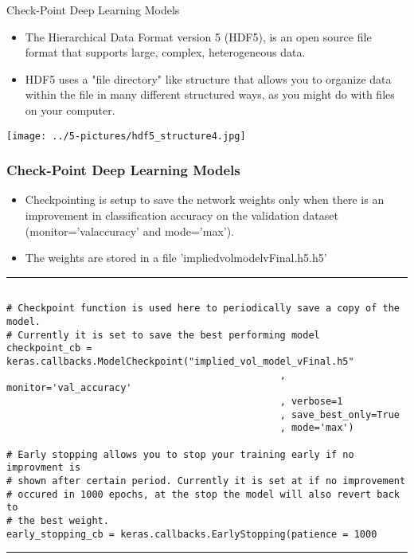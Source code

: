 \documentclass[11pt]{beamer}
\begin{document}
\begin{frame}{Check-Point Deep Learning Models}
\begin{itemize}
\footnotesize
\item The Hierarchical Data Format version 5 (HDF5), is an open source file format that supports large, complex, heterogeneous data. 
\item HDF5 uses a "file directory" like structure that allows you to organize data within the file in many different structured ways, as you might do with files on your computer. 
\end{itemize}
\begin{center}
\texttt{[image: ../5-pictures/hdf5\_structure4.jpg]} 
\end{center}
\end{frame}
\begin{frame}[fragile]
\frametitle{Check-Point Deep Learning Models}
\scriptsize
\begin{itemize}
\item Checkpointing is setup to save the network weights only when there is an improvement in classification accuracy on the validation dataset (monitor=’val\textunderscore accuracy’ and mode=’max’).
\item The weights are stored in a file 'implied\textunderscore vol\textunderscore model\textunderscore vFinal.h5.h5'
\end{itemize}
\rule{\textwidth}{1pt}
\begin{verbatim}

# Checkpoint function is used here to periodically save a copy of the model. 
# Currently it is set to save the best performing model
checkpoint_cb = keras.callbacks.ModelCheckpoint("implied_vol_model_vFinal.h5"
                                                , monitor='val_accuracy'
                                                , verbose=1
                                                , save_best_only=True
                                                , mode='max')

# Early stopping allows you to stop your training early if no improvment is 
# shown after certain period. Currently it is set at if no improvement 
# occured in 1000 epochs, at the stop the model will also revert back to 
# the best weight.
early_stopping_cb = keras.callbacks.EarlyStopping(patience = 1000

\end{verbatim}
\rule{\textwidth}{1pt}
\end{frame}
\end{document}
